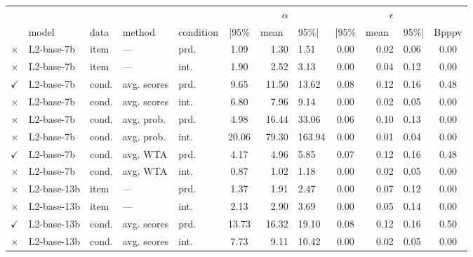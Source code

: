 \documentclass[fleqn]{article}
\begin{document}
\begin{table}[]
\centering
\begin{tabular}{cllllcrlcrlc}
  \toprule
  &&&&&& $\alpha$ &&& $\epsilon$ & \\ \cmidrule(r){6-8} \cmidrule(l){9-11}
  & model & data & method & condition & |95\% & mean\ & 95\%| & |95\% & mean\ & 95\%| & Bpppv \\
  \midrule

  \textcolor{shimmer-main}{$\times$} & L2-base-7b    & item  & ---         & prd. & 1.09  & 1.30   & 1.51   & 0.00 & 0.02 & 0.06 & 0.00 \\
  \textcolor{shimmer-main}{$\times$} & L2-base-7b    & item  & ---         & int. & 1.90  & 2.52   & 3.13   & 0.00 & 0.04 & 0.12 & 0.00 \\
  \textcolor{fern-main}{$\checkmark$} & L2-base-7b    & cond. & avg. scores & prd. & 9.65  & 11.50  & 13.62  & 0.08 & 0.12 & 0.16 & 0.48 \\
  \textcolor{shimmer-main}{$\times$} & L2-base-7b    & cond. & avg. scores & int. & 6.80  & 7.96   & 9.14   & 0.00 & 0.02 & 0.05 & 0.00 \\
  \textcolor{shimmer-main}{$\times$} & L2-base-7b    & cond. & avg. prob.  & prd. & 4.98  & 16.44  & 33.06  & 0.06 & 0.10 & 0.13 & 0.00 \\
  \textcolor{shimmer-main}{$\times$} & L2-base-7b    & cond. & avg. prob.  & int. & 20.06 & 79.30  & 163.94 & 0.00 & 0.01 & 0.04 & 0.00 \\
  \textcolor{fern-main}{$\checkmark$} & L2-base-7b    & cond. & avg. WTA    & prd. & 4.17  & 4.96   & 5.85   & 0.07 & 0.12 & 0.16 & 0.48 \\
  \textcolor{shimmer-main}{$\times$} & L2-base-7b    & cond. & avg. WTA    & int. & 0.87  & 1.02   & 1.18   & 0.00 & 0.02 & 0.05 & 0.00 \\ \addlinespace[0.5em]
  \textcolor{shimmer-main}{$\times$} & L2-base-13b   & item  & ---         & prd. & 1.37  & 1.91   & 2.47   & 0.00 & 0.07 & 0.12 & 0.00 \\
  \textcolor{shimmer-main}{$\times$} & L2-base-13b   & item  & ---         & int. & 2.13  & 2.90   & 3.69   & 0.00 & 0.05 & 0.14 & 0.00 \\
  \textcolor{fern-main}{$\checkmark$} & L2-base-13b   & cond. & avg. scores & prd. & 13.73 & 16.32  & 19.10  & 0.08 & 0.12 & 0.16 & 0.50 \\
  \textcolor{shimmer-main}{$\times$} & L2-base-13b   & cond. & avg. scores & int. & 7.73  & 9.11   & 10.42  & 0.00 & 0.02 & 0.05 & 0.00 \\

\end{tabular}
\end{table}
\end{document}
